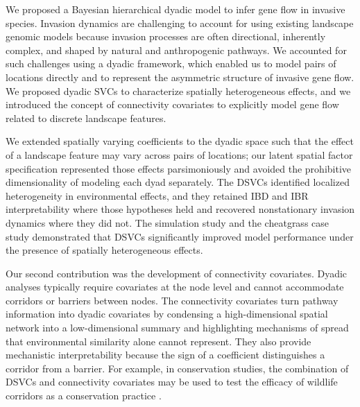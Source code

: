 \documentclass{article}
\begin{document}
We proposed a Bayesian hierarchical dyadic model to infer gene flow in invasive species. Invasion dynamics are challenging to account for using existing landscape genomic models because invasion processes are often directional, inherently complex, and shaped by natural and anthropogenic pathways. We accounted for such challenges using a dyadic framework, which enabled us to model pairs of locations directly and to represent the asymmetric structure of invasive gene flow. We proposed dyadic SVCs to characterize spatially heterogeneous effects, and we introduced the concept of connectivity covariates to explicitly model gene flow related to discrete landscape features. 

We extended spatially varying coefficients to the dyadic space such that the effect of a landscape feature may vary across pairs of locations; our latent spatial factor specification represented those effects parsimoniously and avoided the prohibitive dimensionality of modeling each dyad separately. The DSVCs identified localized heterogeneity in environmental effects, and they retained IBD and IBR interpretability where those hypotheses held and recovered nonstationary invasion dynamics where they did not. The simulation study and the cheatgrass case study demonstrated that DSVCs significantly improved model performance under the presence of spatially heterogeneous effects.

Our second contribution was the development of connectivity covariates.
Dyadic analyses typically require covariates at the node level and cannot accommodate corridors or barriers between nodes. The connectivity covariates turn pathway information into dyadic covariates by condensing a high-dimensional spatial network into a low-dimensional summary and highlighting mechanisms of spread that environmental similarity alone cannot represent. They also provide mechanistic interpretability because the sign of a coefficient distinguishes a corridor from a barrier. For example, in conservation studies, the combination of DSVCs and connectivity covariates may be used to test the efficacy of wildlife corridors as a conservation practice \citep{lindenmayer1993ecological}.
\end{document}
